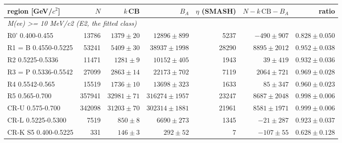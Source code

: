 \begin{tabular}{lrrrrrr}
\toprule
region [GeV/$c^2$] & $N$ & $k\,$CB & $B_A$ & $\eta$ (SMASH) & $N - k\,\mathrm{CB} - B_A$ & ratio \\
\midrule
\multicolumn{7}{l}{\emph{M(ee) >= 10 MeV/c2 (E2, the fitted class)}} \\
R0' 0.400-0.455 & 13786 & $1379 \pm 20$ & $12896 \pm 899$ & 5237 & $-490 \pm 907$ & $0.828 \pm 0.050$ \\
R1 = B 0.4550-0.5225 & 53241 & $5409 \pm 30$ & $38937 \pm 1998$ & 28290 & $8895 \pm 2012$ & $0.952 \pm 0.038$ \\
R2 0.5225-0.5336 & 11471 & $1281 \pm 9$ & $10152 \pm 405$ & 1943 & $39 \pm 419$ & $0.932 \pm 0.036$ \\
R3 = P 0.5336-0.5542 & 27099 & $2863 \pm 14$ & $22173 \pm 702$ & 7119 & $2064 \pm 721$ & $0.969 \pm 0.028$ \\
R4 0.5542-0.565 & 15519 & $1736 \pm 10$ & $13698 \pm 323$ & 1633 & $85 \pm 347$ & $0.960 \pm 0.023$ \\
R5 0.565-0.700 & 357941 & $32981 \pm 71$ & $316274 \pm 1957$ & 23247 & $8687 \pm 2048$ & $0.998 \pm 0.006$ \\
CR-U 0.575-0.700 & 342098 & $31203 \pm 70$ & $302314 \pm 1881$ & 21961 & $8581 \pm 1971$ & $0.999 \pm 0.006$ \\
CR-L 0.5225-0.5300 & 7519 & $850 \pm 8$ & $6690 \pm 273$ & 1345 & $-21 \pm 287$ & $0.923 \pm 0.037$ \\
CR-K S5 0.400-0.5225 & 331 & $146 \pm 3$ & $292 \pm 52$ & 7 & $-107 \pm 55$ & $0.628 \pm 0.128$ \\
\bottomrule
\end{tabular}

